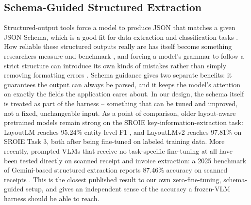 \documentclass[conference]{IEEEtran}
\begin{document}
\subsection{Schema-Guided Structured Extraction}
Structured-output tools force a model to produce JSON that matches a given JSON Schema, which is a good fit for data extraction and classification tasks \cite{b4}. How reliable these structured outputs really are has itself become something researchers measure and benchmark \cite{b30}, and forcing a model's grammar to follow a strict structure can introduce its own kinds of mistakes rather than simply removing formatting errors \cite{b31}. Schema guidance gives two separate benefits: it guarantees the output can always be parsed, and it keeps the model's attention on exactly the fields the application cares about. In our design, the schema itself is treated as part of the harness -- something that can be tuned and improved, not a fixed, unchangeable input. As a point of comparison, older layout-aware pretrained models remain strong on the SROIE key-information-extraction task: LayoutLM reaches 95.24\% entity-level F1 \cite{b8}, and LayoutLMv2 reaches 97.81\% \cite{b9} on SROIE Task 3, both after being fine-tuned on labeled training data. More recently, prompted VLMs that receive no task-specific fine-tuning at all have been tested directly on scanned receipt and invoice extraction: a 2025 benchmark of Gemini-based structured extraction reports 87.46\% accuracy on scanned receipts \cite{b10}. This is the closest published result to our own zero-fine-tuning, schema-guided setup, and gives an independent sense of the accuracy a frozen-VLM harness should be able to reach.
\end{document}
